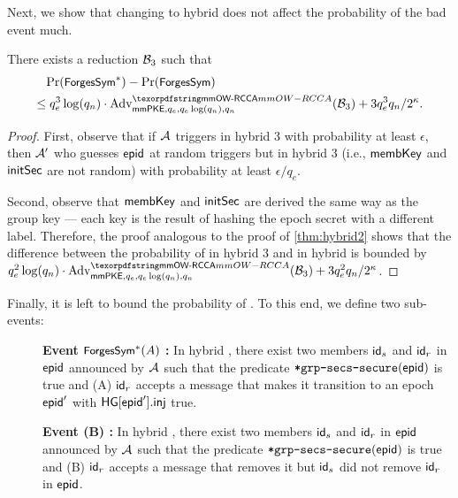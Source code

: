 Next, we show that changing to hybrid \hybridThreeN does not affect the probability of the bad event much.
\begin{claim}
  There exists a reduction $\Bdv[3]$ such that
  \begin{multline*}
    \Pr(\forgessN) - \Pr(\forgess) \hspace*{16em}\\\leq q_e^3\log(q_n) \cdot
    \textnormal{Adv}^{\mmowrcca}_{\mmPKE,q_e,q_e\log(q_n),q_n}(\Bdv[3]) 
    + 3q_e^3q_n/2^\kappa.
  \end{multline*}
\end{claim}
\begin{proof}
  First, observe that if $\Adv$ triggers \forgess in hybrid 3 with probability at least $\epsilon$, then $\Adv'$ who guesses $\hgnodeid$ at random triggers \forgessN but in hybrid 3 (i.e., $\membershipKey$ and $\initSecret$ are not random) with probability at least $\epsilon/q_e$.

  Second, observe that $\membershipKey$ and $\initSecret$ are derived the same way as the group key --- each key is the result of hashing the epoch secret with a different label. Therefore, the proof analogous to the proof of \cref{thm:hybrid2} shows that the difference between the probability of \forgessN in hybrid 3 and \forgessN in hybrid \hybridThreeN is bounded by $q_e^2\log(q_n) \cdot \textnormal{Adv}^{\mmowrcca}_{\mmPKE,q_e,q_e\log(q_n),q_n}(\Bdv[3]) + 3q_e^2q_n/2^\kappa$.
\end{proof}

Finally, it is left to bound the probability of \forgessN. To this end, we define two sub-events:
\begin{description}
  \item[] {\bf Event $\forgessN(A)$ : } In hybrid \hybridThreeN, there exist two members $\id_s$ and $\id_r$ in $\hgnodeid$ announced by $\Adv$ such that the predicate $\safeGrpSecsSecure(\hgnodeid)$ is true and (A) $\id_r$ accepts a message that makes it transition to an epoch $\hgnodeid'$ with $\hg[\hgnodeid'].\hginj$ true.
  \item[] {\bf Event \forgessN(B) : } In hybrid \hybridThreeN, there exist two members $\id_s$ and $\id_r$ in $\hgnodeid$ announced by $\Adv$ such that the predicate $\safeGrpSecsSecure(\hgnodeid)$ is true and (B) $\id_r$ accepts a message that removes it but $\id_s$ did not remove $\id_r$ in $\hgnodeid$.
\end{description}

